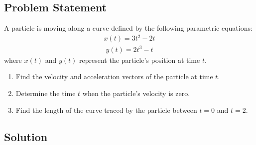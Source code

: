 \documentclass[letterpaper,10pt,english]{jupyterBook}
\begin{document}
\subsection{Problem Statement}
\label{\detokenize{prerequisites:id3}}
\sphinxAtStartPar
A particle is moving along a curve defined by the following parametric equations:
\begin{equation*}
\begin{split}
x(t) = 3t^2 - 2t
\end{split}
\end{equation*}\begin{equation*}
\begin{split}
y(t) = 2t^3 - t
\end{split}
\end{equation*}
\sphinxAtStartPar
where \(x(t)\) and \(y(t)\) represent the particle’s position at time \(t\).
\begin{enumerate}
%
\item {} 
\sphinxAtStartPar
Find the velocity and acceleration vectors of the particle at time \(t\).

\item {} 
\sphinxAtStartPar
Determine the time \(t\) when the particle’s velocity is zero.

\item {} 
\sphinxAtStartPar
Find the length of the curve traced by the particle between \(t = 0\) and \(t = 2\).

\end{enumerate}


\subsection{Solution}
\label{\detokenize{prerequisites:id4}}
\end{document}
